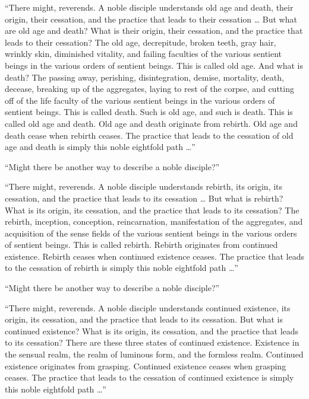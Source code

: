 \documentclass[12pt,openany]{book}%
\begin{document}
“There might, reverends. A noble disciple understands old age and death, their origin, their cessation, and the practice that leads to their cessation … But what are old age and death? What is their origin, their cessation, and the practice that leads to their cessation? The old age, decrepitude, broken teeth, gray hair, wrinkly skin, diminished vitality, and failing faculties of the various sentient beings in the various orders of sentient beings. This is called old age. And what is death? The passing away, perishing, disintegration, demise, mortality, death, decease, breaking up of the aggregates, laying to rest of the corpse, and cutting off of the life faculty of the various sentient beings in the various orders of sentient beings. This is called death. Such is old age, and such is death. This is called old age and death. Old age and death originate from rebirth. Old age and death cease when rebirth ceases. The practice that leads to the cessation of old age and death is simply this noble eightfold path …” 

“Might there be another way to describe a noble disciple?” 

“There might, reverends. A noble disciple understands rebirth, its origin, its cessation, and the practice that leads to its cessation … But what is rebirth? What is its origin, its cessation, and the practice that leads to its cessation? The rebirth, inception, conception, reincarnation, manifestation of the aggregates, and acquisition of the sense fields of the various sentient beings in the various orders of sentient beings. This is called rebirth. Rebirth originates from continued existence. Rebirth ceases when continued existence ceases. The practice that leads to the cessation of rebirth is simply this noble eightfold path …” 

“Might there be another way to describe a noble disciple?” 

“There might, reverends. A noble disciple understands continued existence, its origin, its cessation, and the practice that leads to its cessation. But what is continued existence? What is its origin, its cessation, and the practice that leads to its cessation? There are these three states of continued existence. Existence in the sensual realm, the realm of luminous form, and the formless realm. Continued existence originates from grasping. Continued existence ceases when grasping ceases. The practice that leads to the cessation of continued existence is simply this noble eightfold path …” 
\end{document}
